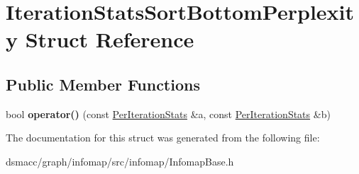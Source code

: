 \hypertarget{structIterationStatsSortBottomPerplexity}{}\section{Iteration\+Stats\+Sort\+Bottom\+Perplexity Struct Reference}
\label{structIterationStatsSortBottomPerplexity}
\subsection*{Public Member Functions}
\begin{DoxyCompactItemize}
\item 
\mbox{\label{structIterationStatsSortBottomPerplexity_a889e8491babc1619c3574d732e21c505}} 
bool {\bfseries operator()} (const \mbox{\hyperlink{structPerIterationStats}{Per\+Iteration\+Stats}} \&a, const \mbox{\hyperlink{structPerIterationStats}{Per\+Iteration\+Stats}} \&b)
\end{DoxyCompactItemize}


The documentation for this struct was generated from the following file\+:\begin{DoxyCompactItemize}
\item 
dsmacc/graph/infomap/src/infomap/Infomap\+Base.\+h\end{DoxyCompactItemize}
